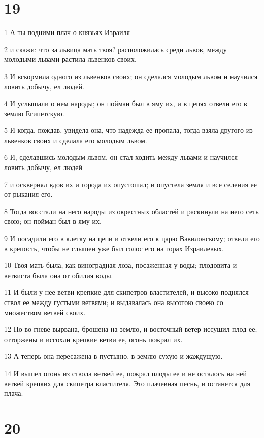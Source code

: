 \chapter{19}

\par 1 А ты подними плач о князьях Израиля
\par 2 и скажи: что за львица мать твоя? расположилась среди львов, между молодыми львами растила львенков своих.
\par 3 И вскормила одного из львенков своих; он сделался молодым львом и научился ловить добычу, ел людей.
\par 4 И услышали о нем народы; он пойман был в яму их, и в цепях отвели его в землю Египетскую.
\par 5 И когда, пождав, увидела она, что надежда ее пропала, тогда взяла другого из львенков своих и сделала его молодым львом.
\par 6 И, сделавшись молодым львом, он стал ходить между львами и научился ловить добычу, ел людей
\par 7 и осквернял вдов их и города их опустошал; и опустела земля и все селения ее от рыкания его.
\par 8 Тогда восстали на него народы из окрестных областей и раскинули на него сеть свою; он пойман был в яму их.
\par 9 И посадили его в клетку на цепи и отвели его к царю Вавилонскому; отвели его в крепость, чтобы не слышен уже был голос его на горах Израилевых.
\par 10 Твоя мать была, как виноградная лоза, посаженная у воды; плодовита и ветвиста была она от обилия воды.
\par 11 И были у нее ветви крепкие для скипетров властителей, и высоко поднялся ствол ее между густыми ветвями; и выдавалась она высотою своею со множеством ветвей своих.
\par 12 Но во гневе вырвана, брошена на землю, и восточный ветер иссушил плод ее; отторжены и иссохли крепкие ветви ее, огонь пожрал их.
\par 13 А теперь она пересажена в пустыню, в землю сухую и жаждущую.
\par 14 И вышел огонь из ствола ветвей ее, пожрал плоды ее и не осталось на ней ветвей крепких для скипетра властителя. Это плачевная песнь, и останется для плача.

\chapter{20}

